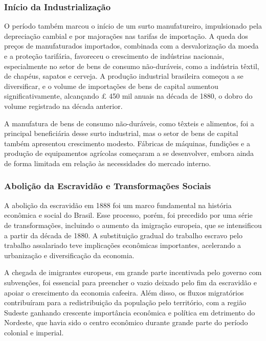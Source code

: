 \documentclass[a4paper,12pt]{article}[abntex2]
\begin{document}
\subsubsection*{Início da Industrialização}

O período também marcou o início de um surto manufatureiro, impulsionado pela depreciação cambial e por majorações nas tarifas de importação. A queda dos preços de manufaturados importados, combinada com a desvalorização da moeda e a proteção tarifária, favoreceu o crescimento de indústrias nacionais, especialmente no setor de bens de consumo não-duráveis, como a indústria têxtil, de chapéus, sapatos e cerveja. A produção industrial brasileira começou a se diversificar, e o volume de importações de bens de capital aumentou significativamente, alcançando £ 450 mil anuais na década de 1880, o dobro do volume registrado na década anterior.

A manufatura de bens de consumo não-duráveis, como têxteis e alimentos, foi a principal beneficiária desse surto industrial, mas o setor de bens de capital também apresentou crescimento modesto. Fábricas de máquinas, fundições e a produção de equipamentos agrícolas começaram a se desenvolver, embora ainda de forma limitada em relação às necessidades do mercado interno.

\subsubsection*{Abolição da Escravidão e Transformações Sociais}

A abolição da escravidão em 1888 foi um marco fundamental na história econômica e social do Brasil. Esse processo, porém, foi precedido por uma série de transformações, incluindo o aumento da imigração europeia, que se intensificou a partir da década de 1880. A substituição gradual do trabalho escravo pelo trabalho assalariado teve implicações econômicas importantes, acelerando a urbanização e diversificação da economia.

A chegada de imigrantes europeus, em grande parte incentivada pelo governo com subvenções, foi essencial para preencher o vazio deixado pelo fim da escravidão e apoiar o crescimento da economia cafeeira. Além disso, os fluxos migratórios contribuíram para a redistribuição da população pelo território, com a região Sudeste ganhando crescente importância econômica e política em detrimento do Nordeste, que havia sido o centro econômico durante grande parte do período colonial e imperial.
\end{document}
